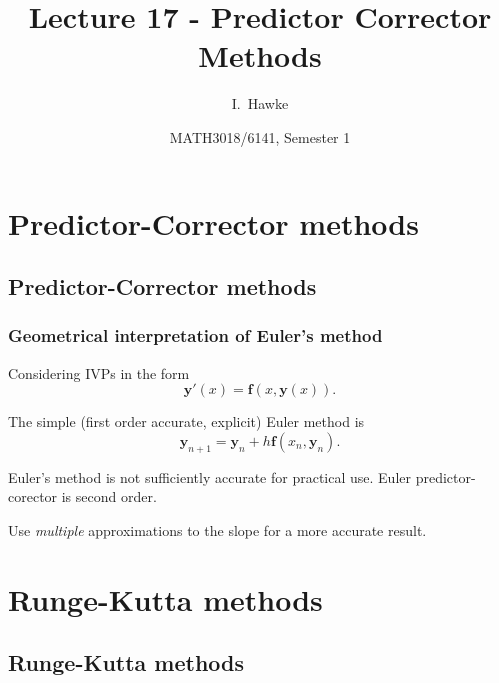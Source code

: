 \documentclass{beamer}
\title[Lecture 17] %
{Lecture 17 - Predictor Corrector Methods}
\author[I. Hawke] %
{I.~Hawke}
\institute[University of Southampton] %
{
  School of Mathematics, \\
  University of Southampton, UK
}
\date[Semester 1] %
{MATH3018/6141, Semester 1}
\newcommand{\by}{{\boldsymbol{y}}}
\newcommand{\bfm}[1]{{\boldsymbol{#1}}}
\begin{document}
\begin{frame}
  \titlepage
\end{frame}

\section{Predictor-Corrector methods}

\subsection{Predictor-Corrector methods}

\begin{frame}
  \frametitle{Geometrical interpretation of Euler's method}

  Considering IVPs in the form
  \begin{equation*}
    \by'(x) = \bfm{f}(x, \by(x)).
  \end{equation*}

  The simple (first order accurate, explicit) Euler method is
  \begin{equation*}
    \by_{n+1} = \by_n + h \bfm{f}(x_n, \by_n).
  \end{equation*} \pause

  Euler's method is not sufficiently accurate for practical use. Euler predictor-corector is second order. \pause

  Use \emph{multiple} approximations to the slope for a more accurate result.

\end{frame}


\section{Runge-Kutta methods}

\subsection{Runge-Kutta methods}
\end{document}
